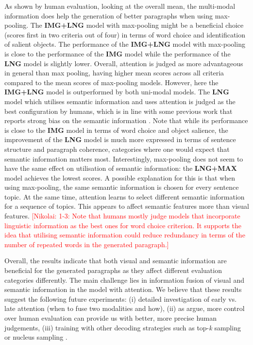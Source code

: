 \documentclass[11pt,a4paper]{article}
\newcommand{\kibitz}[2]{\ifnum\Comments=1\textcolor{#1}{#2}\fi}
\newcommand{\nikolai}[1]{\kibitz{red}  {[Nikolai: #1]}}
\begin{document}
As shown by human evaluation, looking at the overall mean, the multi-modal information does help the generation of better paragraphs when using max-pooling.
The \textbf{IMG+LNG} model with max-pooling might be a beneficial choice (scores first in two criteria out of four) in terms of word choice and identification of salient objects. %
The performance of the \textbf{IMG+LNG} model with max-pooling is close to the performance of the \textbf{IMG} model while the performance of the \textbf{LNG} model is slightly lower.
Overall, attention is judged as more advantageous in general than max pooling, having higher mean scores across all criteria compared to the mean scores of max-pooling models.
However, here the \textbf{IMG+LNG} model is outperformed by both uni-modal models.
The \textbf{LNG} model which utilises semantic information and uses attention is judged as the best configuration by humans, which is in line with some previous work that reports strong bias on the semantic information \cite{Agrawal:2017aa}.
Note that while its performance is close to the \textbf{IMG} model in terms of word choice and object salience, the improvement of the \textbf{LNG} model is much more expressed in terms of sentence structure and paragraph coherence, categories where one would expect that semantic information matters most.
Interestingly, max-pooling does not seem to have the same effect on utilisation of semantic information: the \textbf{LNG+MAX} model achieves the lowest scores.
A possible explanation for this is that when using max-pooling, the same semantic information is chosen for every sentence topic.
At the same time, attention learns to select different semantic information for a sequence of topics.
This appears to affect semantic features more than visual features.
\nikolai{1-3: Note that humans mostly judge models that incorporate linguistic information as the best ones for word choice criterion.
It supports the idea that utilising semantic information could reduce redundancy in terms of the number of repeated words in the generated paragraph.}


Overall, the results indicate that both visual and semantic information are beneficial for the generated paragraphs as they affect different evaluation categories differently. The main challenge lies in information fusion of visual and semantic information in the model with attention.
We believe that these results suggest the following future experiments: (i) detailed investigation of early vs. late attention (when to fuse two modalities and how), (ii) as  argue, more control over human evaluation can provide us with better, more precise human judgements, (iii) training with other decoding strategies such as top-\textit{k} sampling or nucleus sampling \cite{Holtzman2019}.
\end{document}
